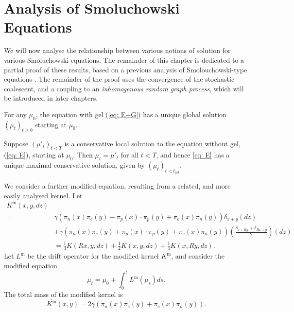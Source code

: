 \section{Analysis of Smoluchowski Equations}We will now analyse the relationship between various notions of solution for various Smoluchowski equations.  The remainder of this chapter is dedicated to a partial proof of these results, based on a previous analysis of Smolouchowski-type equations \cite{N00}. The remainder of the proof uses the convergence of the stochastic coalescent, and a coupling to an \emph{inhomogenous random graph process}, which will be introduced in later chapters.  
\begin{lemma} \label{lemma: E and U} For any $\mu_0$, the equation with gel (\ref{eq: E+G}) has a unique global solution $(\mu_t)_{t\geq 0}$ starting at $\mu_0$.  \end{lemma} \begin{corollary}\label{cor: maximal conservative solutions} Suppose $(\mu'_t)_{t<T}$ is a conservative local solution to the equation without gel, (\ref{eq: E}), starting at $\mu_0$. Then $\mu_t=\mu'_t$ for all $t<T$, and hence \ref{eq: E} has a unique maximal conservative solution, given by $(\mu_t)_{t<t_\text{gel}}$.\end{corollary}  We consider a further modified equation, resulting from a related, and more easily analysed kernel. Let \begin{equation}
    \label{eq: modified K} \begin{split} K^\text{m}(x,y,dz)& \\  = & \gamma(\pi_n(x)\pi_e(y)-\pi_p(x)\cdot \pi_p(y)+ \pi_e(x)\pi_n(y))\delta_{x+y}(dz) \\ & + \gamma(\pi_n(x)\pi_e(y)+\pi_p(x)\cdot \pi_p(y)+ \pi_e(x)\pi_n(y))\left(\frac{\delta_{x+Ry}+\delta_{Rx+y}}{2}\right)(dz) \\ & =\frac{1}{4}K(Rx, y, dz)+\frac{1}{2}K(x,y,dz)+\frac{1}{4}K(x,Ry, dz). \end{split} 
\end{equation} Let $L^\text{m}$ be the drift operator for the modified kernel $K^\text{m}$, and consider the modified equation \begin{equation} \tag{mE-G}\label{eq: mE}
    \mu_t=\mu_0+\int_0^t L^\text{m}(\mu_s)ds.
\end{equation}The total mass of the modified kernel is \begin{equation}
    \label{eq: modified Kbar} \overline{K^\text{m}}(x,y)=2\gamma(\pi_n(x)\pi_e(y)+\pi_e(x)\pi_n(y)).
\end{equation}
